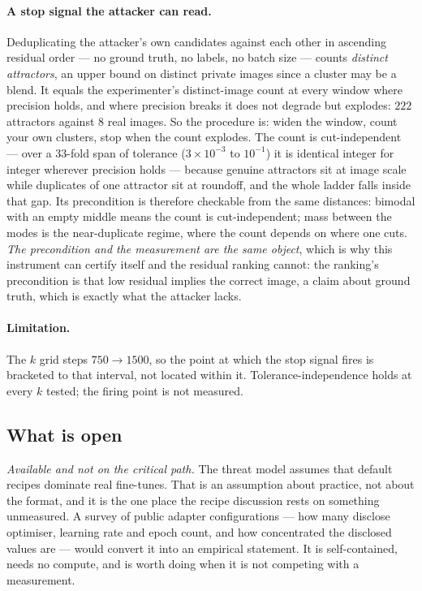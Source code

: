 \paragraph{A stop signal the attacker can read.} Deduplicating the attacker's
own candidates against each other in ascending residual order --- no ground
truth, no labels, no batch size --- counts \emph{distinct attractors}, an upper
bound on distinct private images since a cluster may be a blend. It equals the
experimenter's distinct-image count at every window where precision holds, and
where precision breaks it does not degrade but explodes: $222$ attractors
against $8$ real images. So the procedure is: widen the window, count your own
clusters, stop when the count explodes. The count is cut-independent --- over a
$33$-fold span of tolerance ($3\times10^{-3}$ to $10^{-1}$) it is identical
integer for integer wherever precision holds --- because genuine attractors sit
at image scale while duplicates of one attractor sit at roundoff, and the whole
ladder falls inside that gap. Its precondition is therefore checkable from the
same distances: bimodal with an empty middle means the count is cut-independent;
mass between the modes is the near-duplicate regime, where the count depends on
where one cuts. \emph{The precondition and the measurement are the same object},
which is why this instrument can certify itself and the residual ranking cannot:
the ranking's precondition is that low residual implies the correct image, a
claim about ground truth, which is exactly what the attacker lacks.

\paragraph{Limitation.} The $k$ grid steps $750\to1500$, so the point at which
the stop signal fires is bracketed to that interval, not located within it.
Tolerance-independence holds at every $k$ tested; the firing point is not
measured.

\subsection{What is open}
\label{sec:opens}

\noindent\emph{Available and not on the critical path.} The threat model
assumes that default recipes dominate real fine-tunes. That is an assumption
about practice, not about the format, and it is the one place the recipe
discussion rests on something unmeasured. A survey of public adapter
configurations --- how many disclose optimiser, learning rate and epoch count,
and how concentrated the disclosed values are --- would convert it into an
empirical statement. It is self-contained, needs no compute, and is worth
doing when it is not competing with a measurement.

